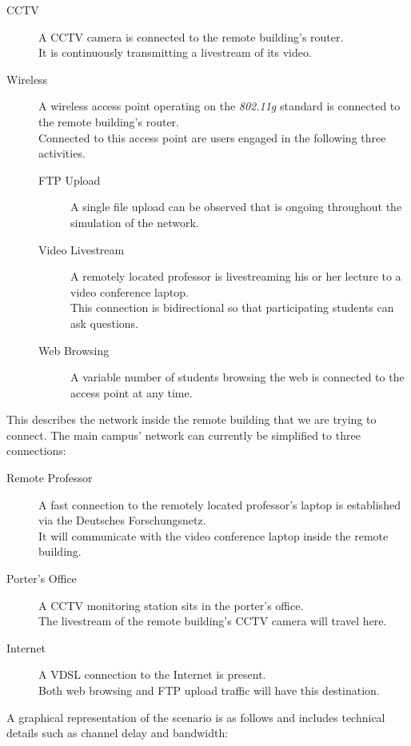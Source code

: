 \documentclass[a4paper]{scrreprt}
\begin{document}
		\begin{description}
		\item[CCTV] A CCTV camera is connected to the remote building's router. \\ It is continuously transmitting a livestream of its video.
		
		\item[Wireless] A wireless access point operating on the \emph{802.11g} standard is connected to the remote building's router. \\Connected to this access point are users engaged in the following three activities.
		\begin{description}
			\item[FTP Upload] A single file upload can be observed that is ongoing throughout the simulation of the network.
			\item[Video Livestream] A remotely located professor is livestreaming his or her lecture to a video conference laptop. \\This connection is bidirectional so that participating students can ask questions.
			\item[Web Browsing] A variable number of students browsing the web is connected to the access point at any time.
		\end{description}
		\end{description}
		
		This describes the network inside the remote building that we are trying to connect. The main campus' network can currently be simplified to three connections:
		
		\begin{description}
			\item[Remote Professor] A fast connection to the remotely located professor's laptop is established via the Deutsches Forschungsnetz. \\It will communicate with the video conference laptop inside the remote building.
			\item[Porter's Office] A CCTV monitoring station sits in the porter's office. \\The livestream of the remote building's CCTV camera will travel here.
			\item[Internet] A VDSL connection to the Internet is present. \\Both web browsing and FTP upload traffic will have this destination.
		\end{description}
		
		A graphical representation of the scenario is as follows and includes technical details such as channel delay and bandwidth:
		
\end{document}
